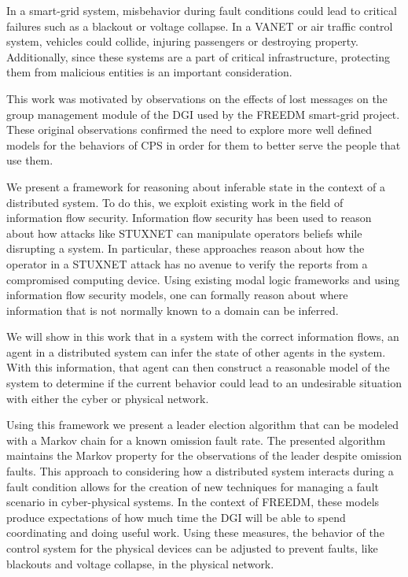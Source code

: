 In a smart-grid system, misbehavior during fault conditions could lead to critical failures such as a blackout or voltage collapse. In a \ac{VANET} or air traffic control system, vehicles could collide, injuring passengers or destroying property. Additionally, since these systems are a part of critical infrastructure, protecting them from malicious entities is an important consideration.

This work was motivated by observations on the effects of lost messages on the group management module of the \ac{DGI} used by the \ac{FREEDM} smart-grid project.
These original observations confirmed the need to explore more well defined models for the behaviors of \ac{CPS} in order for them to better serve the people that use them.

We present a framework for reasoning about inferable state in the context of a distributed system. To do this, we exploit existing work in the field of information flow security. Information flow security has been used to reason about how attacks like STUXNET can manipulate operators beliefs while disrupting a system\cite{STUXNET}. In particular, these approaches reason about how the operator in a STUXNET attack has no avenue to verify the reports from a compromised computing device. Using existing modal logic frameworks and using information flow security models\cite{Howser2012}\cite{STUXNET}\cite{Howser2013}, one can formally reason about where information that is not normally known to a domain can be inferred.

We will show in this work that in a system with the correct information flows, an agent in a distributed system can infer the state of other agents in the system. With this information, that agent can then construct a reasonable model of the system to determine if the current behavior could lead to an undesirable situation with either the cyber or physical network.

Using this framework we present a leader election algorithm that can be modeled with a Markov chain for a known omission fault\cite{OMISSIONFAILURES} rate.
The presented algorithm maintains the Markov property for the observations of the leader despite omission faults.
This approach to considering how a distributed system interacts during a fault condition allows for the creation of new techniques for managing a fault scenario in cyber-physical systems.
In the context of \ac{FREEDM}, these models produce expectations of how much time the DGI will be able to spend coordinating and doing useful work.
Using these measures, the behavior of the control system for the physical devices can be adjusted to prevent faults, like blackouts and voltage collapse, in the physical network.

